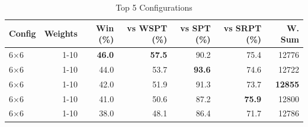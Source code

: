 \begin{table}[htbp]%
\centering%
\begin{tabular}{lrrrrrr}%
\toprule%
\textbf{Config}&\textbf{Weights}&\textbf{Win (\%)}&\textbf{vs WSPT (\%)}&\textbf{vs SPT (\%)}&\textbf{vs SRPT (\%)}&\textbf{W. Sum}\\%
\midrule%
6×6&1-10&\textbf{46.0}&\textbf{57.5}&90.2&75.4&12776\\%
6×6&1-10&44.0&53.7&\textbf{93.6}&74.6&12722\\%
6×6&1-10&42.0&51.9&91.3&73.7&\textbf{12855}\\%
6×6&1-10&41.0&50.6&87.2&\textbf{75.9}&12800\\%
6×6&1-10&38.0&48.1&86.4&71.7&12786\\%
\bottomrule%
\end{tabular}%
\caption{Top 5 Configurations}%
\label{tab:summary}%
\end{table}